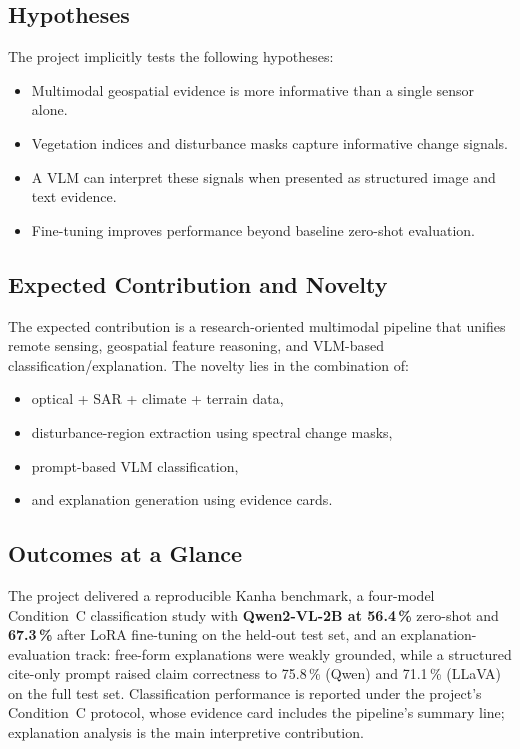 \documentclass[11pt]{article}
\begin{document}
\subsection{Hypotheses}
The project implicitly tests the following hypotheses:
\begin{itemize}
    \item Multimodal geospatial evidence is more informative than a single sensor alone.
    \item Vegetation indices and disturbance masks capture informative change signals.
    \item A VLM can interpret these signals when presented as structured image and text evidence.
    \item Fine-tuning improves performance beyond baseline zero-shot evaluation.
\end{itemize}

\subsection{Expected Contribution and Novelty}
The expected contribution is a research-oriented multimodal pipeline that unifies remote sensing, geospatial feature reasoning, and VLM-based classification/explanation. The novelty lies in the combination of:
\begin{itemize}
    \item optical + SAR + climate + terrain data,
    \item disturbance-region extraction using spectral change masks,
    \item prompt-based VLM classification,
    \item and explanation generation using evidence cards.
\end{itemize}

\subsection{Outcomes at a Glance}
The project delivered a reproducible Kanha benchmark, a four-model Condition~C classification study with \textbf{Qwen2-VL-2B at 56.4\,\%} zero-shot and \textbf{67.3\,\%} after LoRA fine-tuning on the held-out test set, and an explanation-evaluation track: free-form explanations were weakly grounded, while a structured cite-only prompt raised claim correctness to 75.8\,\% (Qwen) and 71.1\,\% (LLaVA) on the full test set. Classification performance is reported under the project's Condition~C protocol, whose evidence card includes the pipeline's summary line; explanation analysis is the main interpretive contribution.
\end{document}
